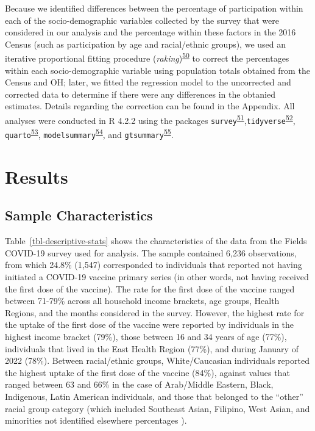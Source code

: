 \documentclass[
]{article}
\begin{document}
Because we identified differences between the percentage of
participation within each of the socio-demographic variables collected
by the survey that were considered in our analysis and the percentage
within these factors in the 2016 Census (such as participation by age
and racial/ethnic groups), we used an iterative proportional fitting
procedure
(\emph{raking})\textsuperscript{\protect\hyperlink{ref-deming1940}{50}}
to correct the percentages within each socio-demographic variable using
population totals obtained from the Census and OH; later, we fitted the
regression model to the uncorrected and corrected data to determine if
there were any differences in the obtanied estimates. Details regarding
the correction can be found in the Appendix. All analyses were conducted
in R 4.2.2 using the packages
\texttt{survey}\textsuperscript{\protect\hyperlink{ref-lumley2011}{51}},\texttt{tidyverse}\textsuperscript{\protect\hyperlink{ref-wickham2019}{52}},
\texttt{quarto}\textsuperscript{\protect\hyperlink{ref-quarto}{53}},
\texttt{modelsummary}\textsuperscript{\protect\hyperlink{ref-modelsummary}{54}},
and
\texttt{gtsummary}\textsuperscript{\protect\hyperlink{ref-gtsummary}{55}}.

\hypertarget{results}{%
\section{Results}\label{results}}

\hypertarget{sample-characteristics}{%
\subsection{Sample Characteristics}\label{sample-characteristics}}

Table~\ref{tbl-descriptive-stats} shows the characteristics of the data
from the Fields COVID-19 survey used for analysis. The sample contained
6,236 observations, from which 24.8\% (1,547) corresponded to
individuals that reported not having initiated a COVID-19 vaccine
primary series (in other words, not having received the first dose of
the vaccine). The rate for the first dose of the vaccine ranged between
71-79\% across all household income brackets, age groups, Health
Regions, and the months considered in the survey. However, the highest
rate for the uptake of the first dose of the vaccine were reported by
individuals in the highest income bracket (79\%), those between 16 and
34 years of age (77\%), individuals that lived in the East Health Region
(77\%), and during January of 2022 (78\%). Between racial/ethnic groups,
White/Caucasian individuals reported the highest uptake of the first
dose of the vaccine (84\%), against values that ranged between 63 and
66\% in the case of Arab/Middle Eastern, Black, Indigenous, Latin
American individuals, and those that belonged to the ``other'' racial
group category (which included Southeast Asian, Filipino, West Asian,
and minorities not identified elsewhere percentages ).
\end{document}
